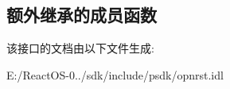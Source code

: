 \subsection*{额外继承的成员函数}


该接口的文档由以下文件生成\+:\begin{DoxyCompactItemize}
\item 
E\+:/\+React\+O\+S-\/0../sdk/include/psdk/opnrst.\+idl\end{DoxyCompactItemize}
